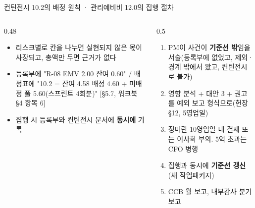 \begin{frame}{컨틴전시 10.2의 배정 원칙 · 관리예비비 12.0의 집행 절차}
\begin{columns}[T]
\begin{column}{0.48\textwidth}
\begin{itemize}
\item 리스크별로 칸을 나누면 실현되지 않은 몫이 사장되고, 총액만 두면 근거가 없다
\item 등록부에 "R-08 EMV 2.00 \ra{} 잔여 0.60" / 배정표에 "10.2 = 잔여 4.58 \ra{} 배정 4.60 + 미배정 풀 5.60(스프린트 4회분)" [§5.7, 워크북 §4 항목 6]
\item 집행 시 등록부와 컨틴전시 문서에 \textbf{동시에} 기록
\end{itemize}
\end{column}
\begin{column}{0.5\textwidth}
\begin{enumerate}
\item PM이 사건이 \textbf{기준선 밖}임을 서술(등록부에 없었고, 제외·경계 밖에서 왔고, 컨틴전시로 불가)
\item 영향 분석 + 대안 3 + 권고를 예외 보고 형식으로(헌장 §12, 5영업일)
\item 정미란 10영업일 내 결재 또는 이사회 부의. 5억 초과는 CFO 병행
\item 집행과 동시에 \textbf{기준선 갱신}(새 작업패키지)
\item CCB 월 보고, 내부감사 분기 보고
\end{enumerate}
\end{column}
\end{columns}
\end{frame}

